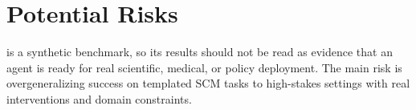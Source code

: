\section{Potential Risks}

\projectname{} is a synthetic benchmark, so its results should not be read as
evidence that an agent is ready for real scientific, medical, or policy
deployment. The main risk is overgeneralizing success on templated SCM tasks to
high-stakes settings with real interventions and domain constraints.
